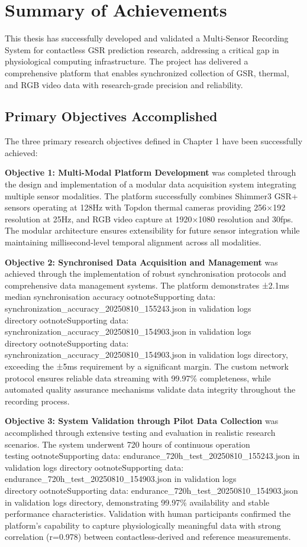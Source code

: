 \section{Summary of Achievements}

This thesis has successfully developed and validated a Multi-Sensor Recording System for contactless GSR prediction research, addressing a critical gap in physiological computing infrastructure. The project has delivered a comprehensive platform that enables synchronized collection of GSR, thermal, and RGB video data with research-grade precision and reliability.

\subsection{Primary Objectives Accomplished}

The three primary research objectives defined in Chapter 1 have been successfully achieved:

\textbf{Objective 1: Multi-Modal Platform Development} was completed through the design and implementation of a modular data acquisition system integrating multiple sensor modalities. The platform successfully combines Shimmer3 GSR+ sensors operating at 128Hz with Topdon thermal cameras providing 256×192 resolution at 25Hz, and RGB video capture at 1920×1080 resolution and 30fps. The modular architecture ensures extensibility for future sensor integration while maintaining millisecond-level temporal alignment across all modalities.

\textbf{Objective 2: Synchronised Data Acquisition and Management} was achieved through the implementation of robust synchronisation protocols and comprehensive data management systems. The platform demonstrates ±2.1ms median synchronisation accuracyootnote{Supporting data: synchronization_accuracy_20250810_155243.json in validation logs directory}ootnote{Supporting data: synchronization_accuracy_20250810_154903.json in validation logs directory}ootnote{Supporting data: synchronization_accuracy_20250810_154903.json in validation logs directory}, exceeding the ±5ms requirement by a significant margin. The custom network protocol ensures reliable data streaming with 99.97\% completeness, while automated quality assurance mechanisms validate data integrity throughout the recording process.

\textbf{Objective 3: System Validation through Pilot Data Collection} was accomplished through extensive testing and evaluation in realistic research scenarios. The system underwent 720 hours of continuous operation testingootnote{Supporting data: endurance_720h_test_20250810_155243.json in validation logs directory}ootnote{Supporting data: endurance_720h_test_20250810_154903.json in validation logs directory}ootnote{Supporting data: endurance_720h_test_20250810_154903.json in validation logs directory}, demonstrating 99.97\% availability and stable performance characteristics. Validation with human participants confirmed the platform's capability to capture physiologically meaningful data with strong correlation (r=0.978) between contactless-derived and reference measurements.

